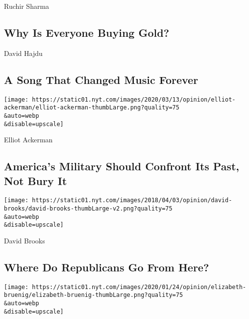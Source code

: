 Ruchir Sharma

\hypertarget{why-is-everyone-buying-gold}{%
\subsection{Why Is Everyone Buying
Gold?}\label{why-is-everyone-buying-gold}}

\href{/2020/08/08/opinion/sunday/crazy-blues-mamie-smith.html}{}

David Hajdu

\hypertarget{a-song-that-changed-music-forever}{%
\subsection{A Song That Changed Music
Forever}\label{a-song-that-changed-music-forever}}

\href{/2020/08/08/opinion/nazi-confederate-military-history-ksk.html}{}

\texttt{[image: https://static01.nyt.com/images/2020/03/13/opinion/elliot-ackerman/elliot-ackerman-thumbLarge.png?quality=75\\\&auto=webp\\\&disable=upscale]}

Elliot Ackerman

\hypertarget{americas-military-should-confront-its-past-not-bury-it}{%
\subsection{America's Military Should Confront Its Past, Not Bury
It}\label{americas-military-should-confront-its-past-not-bury-it}}

\href{/2020/08/07/opinion/sunday/republican-party-trump-2020.html}{}

\texttt{[image: https://static01.nyt.com/images/2018/04/03/opinion/david-brooks/david-brooks-thumbLarge-v2.png?quality=75\\\&auto=webp\\\&disable=upscale]}

David Brooks

\hypertarget{where-do-republicans-go-from-here}{%
\subsection{Where Do Republicans Go From
Here?}\label{where-do-republicans-go-from-here}}

\href{/2020/08/06/opinion/sunday/gloria-purvis-george-floyd-blm.html}{}

\texttt{[image: https://static01.nyt.com/images/2020/01/24/opinion/elizabeth-bruenig/elizabeth-bruenig-thumbLarge.png?quality=75\\\&auto=webp\\\&disable=upscale]}

